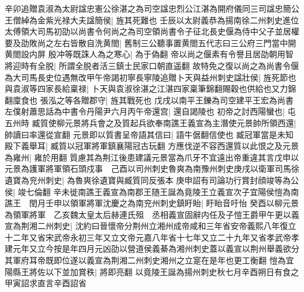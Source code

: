 辛卯追贈袁淑為太尉諡忠憲公徐湛之為司空諡忠烈公江湛為開府儀同三司諡忠簡公王僧綽為金紫光禄大夫諡簡侯|{
	旌其死難也}
壬辰以太尉義恭為揚南徐二州刺史進位太傅領大司馬初劭以尚書令何尚之為司空領尚書令子征北長史偃為侍中父子並居權要及劭敗尚之左右皆散自洗黄閤|{
	舊制三公聽事置黄閤五代志曰三公府三門當中開黄閤設内屏}
殷冲等既誅人為之寒心|{
	為于偽翻}
帝以尚之偃素有令譽且居劭朝用智將迎時有全脱|{
	所謂全脱者活三鎮士民家口朝直遥翻}
故特免之復以尚之為尚書令偃為大司馬長史位遇無改甲午帝謁初寧長寧陵追贈卜天與益州刺史諡壯侯|{
	旌死節也}
與袁淑等四家長給稟禄|{
	卜天與袁淑徐湛之江湛四家稟筆錦翻賜穀也供給也又力錦翻廩食也}
張泓之等各贈郡守|{
	旌其戰死也}
戊戌以南平王鑠為司空建平王宏為尚書左僕射蕭思話為中書令丹陽尹六月丙午帝還宫|{
	還自謁陵也}
初帝之討西陽蠻也|{
	屯五州時}
臧質使柳元景將兵會之及質起兵欲奉南譙王義宣為主潛使元景帥所領西還|{
	帥讀曰率還從宣翻}
元景即以質書呈帝語其信曰|{
	語牛倨翻信使也}
臧冠軍當是未知殿下義舉耳|{
	臧質以冠軍將軍鎮襄陽冠古玩翻}
方應伐逆不容西還質以此恨之及元景為雍州|{
	雍於用翻}
質慮其為荆江後患建議元景當為爪牙不宜遠出帝重違其言戊申以元景為護軍將軍領石頭戍事　己酉以司州刺史魯爽為南豫州刺史庚戌以衛軍司馬徐遺寶為兖州刺史|{
	為魯爽徐遺寶與臧質同反張本}
庚申詔有司論功行賞封顔竣等為公侯|{
	竣七倫翻}
辛未徙南譙王義宣為南郡王随王誕為竟陵王立義宣次子宜陽侯愷為南譙王　閏月壬申以領軍將軍沈慶之為南兖州刺史鎮盱眙|{
	盱眙音吁怡}
癸酉以柳元景為領軍將軍　乙亥魏太皇太后赫連氏殂　丞相義宣固辭内任及子愷王爵甲午更以義宣為荆湘二州刺史|{
	沈約曰晉懷帝分荆州立湘州成帝咸和三年省安帝義熙八年復立十二年又省宋武帝永初三年又立文帝元嘉八年省十七年又立二十九年又省孝武帝孝建元年又立今按是年四月元凶劭以營道侯義綦為湘州刺史蓋以義宣以荆州舉義欲分其軍府耳帝既即位遂以義宣為荆湘二州刺史湘州之立寔在是年也更工衡翻}
愷為宜陽縣王將佐以下並加賞秩|{
	將即亮翻}
以竟陵王誕為揚州刺史秋七月辛酉朔日有食之甲寅詔求直言辛酉詔省

